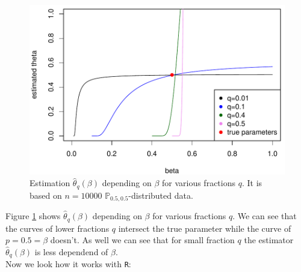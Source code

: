 \documentclass[10pt, a4paper]{article}\usepackage[]{graphicx}\usepackage[]{color}
\newenvironment{knitrout}{}{} %
\begin{document}
\begin{figure} 
\begin{knitrout}
\color{fgcolor}

{\centering \includegraphics[width=.6\linewidth]{figure/minimal-plot1_-1} 

}



\end{knitrout}
\vspace{-0.4cm}
\caption{Estimation $\hat{\theta}_q(\beta)$ depending on $\beta$ for various fractions $q$. It is based on $n=10000$ $\mathbb{P}_{0.5,0.5}$-distributed data.}
\label{fig1}
\end{figure}
Figure \ref{fig1} shows $\hat{\theta}_q(\beta)$ depending on $\beta$ for various fractions $q$. We can see that the curves of lower fractions $q$ intersect the true parameter while the curve of $p=0.5=\beta$ doesn't. As well we can see that for small fraction $q$ the estimator $\hat{\theta}_q(\beta)$ is less dependend of $\beta$.
\\
Now we look how it works with \texttt{R}:
\end{document}
